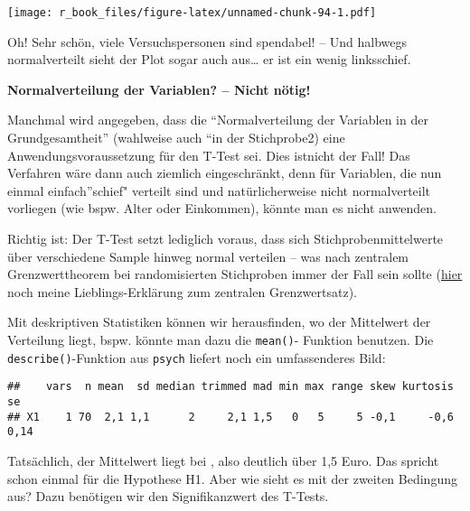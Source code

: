 \documentclass[
]{book}
\newenvironment{Shaded}{\begin{snugshade}}{\end{snugshade}}
\newcommand{\FunctionTok}[1]{\textcolor[rgb]{0.00,0.00,0.00}{#1}}
\newcommand{\NormalTok}[1]{#1}
\newcommand{\SpecialCharTok}[1]{\textcolor[rgb]{0.00,0.00,0.00}{#1}}
\begin{document}
\texttt{[image: r\_book\_files/figure-latex/unnamed-chunk-94-1.pdf]}

Oh! Sehr schön, viele Versuchspersonen sind spendabel! -- Und halbwegs normalverteilt sieht der Plot sogar auch aus\ldots{} er ist ein wenig linksschief.

\leavevmode\hypertarget{info_levene}{}%
\textbf{Normalverteilung der Variablen? -- Nicht nötig!}

Manchmal wird angegeben, dass die ``Normalverteilung der Variablen in der Grundgesamtheit'' (wahlweise auch ``in der Stichprobe2) eine Anwendungsvoraussetzung für den T-Test sei. Dies istnicht der Fall! Das Verfahren wäre dann auch ziemlich eingeschränkt, denn für Variablen, die nun einmal einfach''schief" verteilt sind und natürlicherweise nicht normalverteilt vorliegen (wie bspw. Alter oder Einkommen), könnte man es nicht anwenden.

Richtig ist: Der T-Test setzt lediglich voraus, dass sich Stichprobenmittelwerte über verschiedene Sample hinweg normal verteilen -- was nach zentralem Grenzwerttheorem bei randomisierten Stichproben immer der Fall sein sollte (\href{https://www.youtube.com/watch?v=jvoxEYmQHNM}{hier} noch meine Lieblings-Erklärung zum zentralen Grenzwertsatz).

Mit deskriptiven Statistiken können wir herausfinden, wo der Mittelwert der Verteilung liegt, bspw. könnte man dazu die \texttt{mean()}- Funktion benutzen. Die \texttt{describe()}-Funktion aus \texttt{psych} liefert noch ein umfassenderes Bild:

\begin{Shaded}
\end{Shaded}

\begin{verbatim}
##    vars  n mean  sd median trimmed mad min max range skew kurtosis   se
## X1    1 70  2,1 1,1      2     2,1 1,5   0   5     5 -0,1     -0,6 0,14
\end{verbatim}

Tatsächlich, der Mittelwert liegt bei , also deutlich über 1,5 Euro. Das spricht schon einmal für die Hypothese H1. Aber wie sieht es mit der zweiten Bedingung aus? Dazu benötigen wir den Signifikanzwert des T-Tests.
\end{document}
